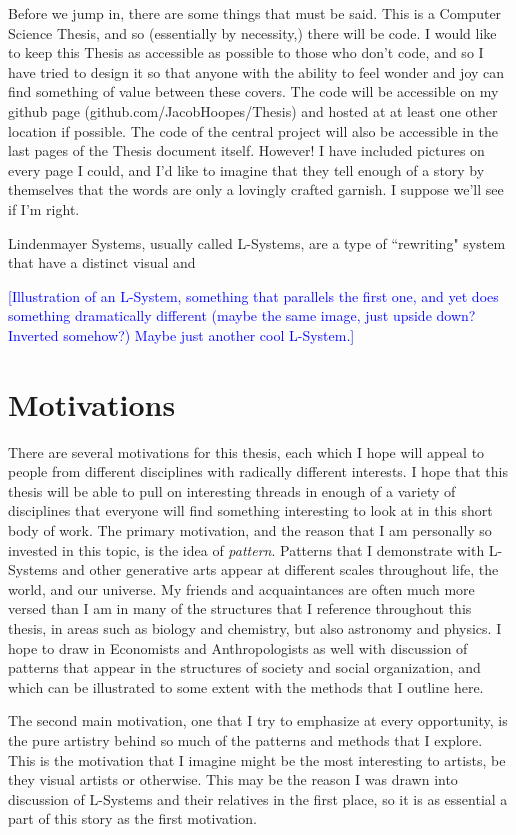 \documentclass[12pt,twoside]{reedthesis}
\begin{document}
Before we jump in, there are some things that must be said. This is a Computer Science Thesis, and so (essentially by necessity,) there will be code. I would like to keep this Thesis as accessible as possible to those who don’t code, and so I have tried to design it so that anyone with the ability to feel wonder and joy can find something of value between these covers. The code will be accessible on my github page (github.com/JacobHoopes/Thesis) and hosted at at least one other location if possible. The code of the central project will also be accessible in the last pages of the Thesis document itself. However! I have included pictures on every page I could, and I’d like to imagine that they tell enough of a story by themselves that the words are only a lovingly crafted garnish. I suppose we’ll see if I’m right. 

Lindenmayer Systems, usually called L-Systems, are a type of ``rewriting" system that have a distinct visual and 

\textcolor{blue}{[Illustration of an L-System, something that parallels the first one, and yet does something dramatically different (maybe the same image, just upside down? Inverted somehow?) Maybe just another cool L-System.]}


\section{Motivations}
	
There are several motivations for this thesis, each which I hope will appeal to people from different disciplines with radically different interests. I hope that this thesis will be able to pull on interesting threads in enough of a variety of disciplines that everyone will find something interesting to look at in this short body of work. The primary motivation, and the reason that I am personally so invested in this topic, is the idea of \textit{pattern}. Patterns that I demonstrate with L-Systems and other generative arts appear at different scales throughout life, the world, and our universe. My friends and acquaintances are often much more versed than I am in many of the structures that I reference throughout this thesis, in areas such as biology and chemistry, but also astronomy and physics. I hope to draw in Economists and Anthropologists as well with discussion of patterns that appear in the structures of society and social organization, and which can be illustrated to some extent with the methods that I outline here.

	The second main motivation, one that I try to emphasize at every opportunity, is the pure artistry behind so much of the patterns and methods that I explore. This is the motivation that I imagine might be the most interesting to artists, be they visual artists or otherwise. This may be the reason I was drawn into discussion of L-Systems and their relatives in the first place, so it is as essential a part of this story as the first motivation. 
	
\end{document}
